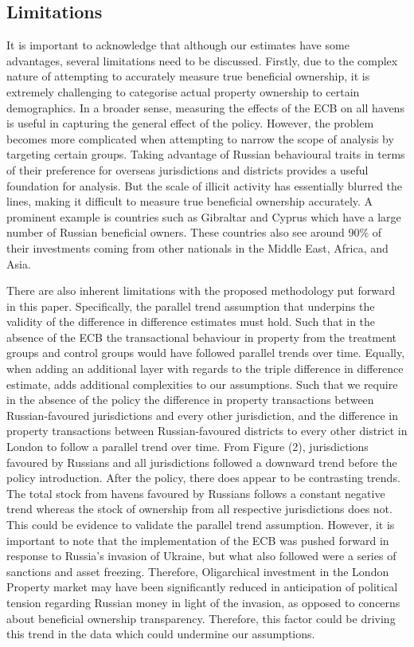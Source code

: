 \documentclass{article}
\begin{document}
\subsection{Limitations}

It is important to acknowledge that although our estimates have some advantages, several limitations need to be discussed. Firstly, due to the complex nature of attempting to accurately measure true beneficial ownership, it is extremely challenging to categorise actual property ownership to certain demographics. In a broader sense, measuring the effects of the ECB on all havens is useful in capturing the general effect of the policy. However, the problem becomes more complicated when attempting to narrow the scope of analysis by targeting certain groups. Taking advantage of Russian behavioural traits in terms of their preference for overseas jurisdictions and districts provides a useful foundation for analysis. But the scale of illicit activity has essentially blurred the lines, making it difficult to measure true beneficial ownership accurately. A prominent example is countries such as Gibraltar and Cyprus which have a large number of Russian beneficial owners. These countries also see around 90{\%} of their investments coming from other nationals in the Middle East, Africa, and Asia.

There are also inherent limitations with the proposed methodology put forward in this paper. Specifically, the parallel trend assumption that underpins the validity of the difference in difference estimates must hold. Such that in the absence of the ECB the transactional behaviour in property from the treatment groups and control groups would have followed parallel trends over time. Equally, when adding an additional layer with regards to the triple difference in difference estimate, adds additional complexities to our assumptions. Such that we require in the absence of the policy the difference in property transactions between Russian-favoured jurisdictions and every other jurisdiction, and the difference in property transactions between Russian-favoured districts to every other district in London to follow a parallel trend over time. From Figure (2), jurisdictions favoured by Russians and all jurisdictions followed a downward trend before the policy introduction. After the policy, there does appear to be contrasting trends. The total stock from havens favoured by Russians follows a constant negative trend whereas the stock of ownership from all respective jurisdictions does not. This could be evidence to validate the parallel trend assumption. However, it is important to note that the implementation of the ECB was pushed forward in response to Russia’s invasion of Ukraine, but what also followed were a series of sanctions and asset freezing. Therefore, Oligarchical investment in the London Property market may have been significantly reduced in anticipation of political tension regarding Russian money in light of the invasion, as opposed to concerns about beneficial ownership transparency. Therefore, this factor could be driving this trend in the data which could undermine our assumptions.
\end{document}
